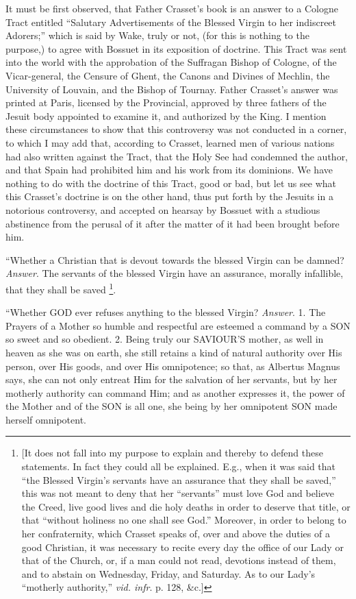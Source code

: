 It must be first observed, that Father Crasset's
book is an answer to a Cologne Tract entitled ``Salutary Advertisements
of the Blessed Virgin to her indiscreet Adorers;'' which is said by
Wake, truly or not, (for this is nothing to the purpose,) to
agree with Bossuet in its exposition of doctrine. This Tract was sent
into the world with the approbation of the Suffragan Bishop of
Cologne, of the Vicar-general, the Censure of Ghent, the Canons and
Divines of Mechlin, the University of Louvain, and the Bishop of
Tournay. Father Crasset's answer was printed at Paris, licensed by the
Provincial, approved by three fathers of the Jesuit body appointed to
examine it, and authorized by the King. I mention these circumstances
to show that this controversy was not conducted in a corner, to which
I may add that, according to Crasset, learned men of various nations
had also written against the Tract, that the Holy See had condemned
the author, and that Spain had prohibited him and his work from its
dominions. We have nothing to do with the doctrine of this Tract, good
or bad, but let us see what this Crasset's doctrine is on the other
hand, thus put forth by the Jesuits in a notorious controversy, and
accepted on hearsay by Bossuet with a studious abstinence from the
perusal of it after the matter of it had been brought before him.

``Whether
a Christian that is devout towards the blessed Virgin can be damned? \emph{Answer}.
The servants of the blessed Virgin have an assurance, morally
infallible, that they shall be saved \footnote{[It does not fall into my purpose to explain and thereby to defend
these statements. In fact they could all be explained. E.g., when it
was said that ``the Blessed Virgin's servants have an assurance that
they shall be saved,'' this was not meant to deny that her ``servants''
must love God and believe the Creed, live good lives and die holy
deaths in order to deserve that title, or that ``without holiness no
one shall see God.'' Moreover, in order to belong to her confraternity,
which Crasset speaks of, over and above the duties of a good
Christian, it was necessary to recite every day the office of our Lady
or that of the Church, or, if a man could not read, devotions instead
of them, and to abstain on Wednesday, Friday, and Saturday. As to our
Lady's ``motherly authority,'' \emph{vid. infr}. p. 128, \&c.]}.

``Whether
GOD ever
refuses anything to the blessed Virgin? \emph{Answer}. 1. The Prayers
of a Mother so humble and respectful are esteemed a command by a SON
so sweet and so obedient. 2. Being truly our SAVIOUR'S
mother, as well in heaven as she was on earth, she still retains a
kind of natural authority over His person, over His goods, and over
His omnipotence; so that, as Albertus Magnus says, she can not only
entreat Him for the salvation of her servants, but by her motherly
authority can command Him; and as another expresses it, the power of
the Mother and of the SON
is all one, she being by her omnipotent SON
made herself omnipotent.

